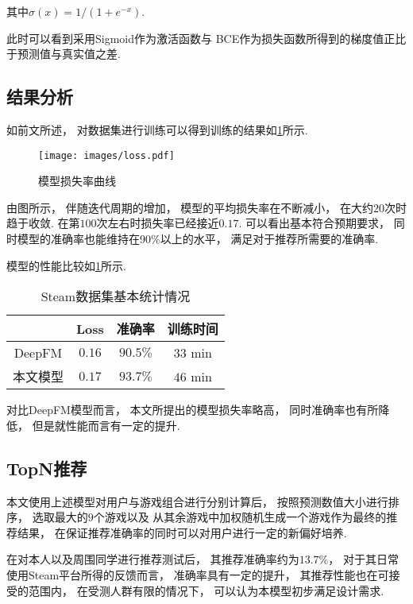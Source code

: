其中$ \sigma(x)=1/\left(1+e^{-x}\right) $.

此时可以看到采用Sigmoid作为激活函数与
BCE作为损失函数所得到的梯度值正比于预测值与真实值之差.

\subsection{结果分析}

如前文所述，
对数据集进行训练可以得到训练的结果如\cref{fig:loss}所示.

\begin{figure}[!htbp]
  \centering
  \texttt{[image: images/loss.pdf]}
  \caption{模型损失率曲线}\label{fig:loss}
\end{figure}

由图所示，
伴随迭代周期的增加，
模型的平均损失率在不断减小，
在大约$20$次时趋于收敛.
在第$100$次左右时损失率已经接近$0.17$.
可以看出基本符合预期要求，
同时模型的准确率也能维持在90\%以上的水平，
满足对于推荐所需要的准确率.

模型的性能比较如\cref{tb:comp}所示.

\begin{table}[!htbp]
  \begin{center}
    \caption{Steam数据集基本统计情况}\label{tb:comp}
    \begin{tabular}{cccc}
      \toprule
             & Loss   & 准确率 & 训练时间     \\
      \midrule
      DeepFM & $0.16$ & $90.5\%$  & $33$ min \\
      本文模型   & $0.17$ & $93.7\%$  & $46$ min    \\
      \bottomrule
    \end{tabular}
  \end{center}
\end{table}

对比DeepFM模型而言，
本文所提出的模型损失率略高，
同时准确率也有所降低，
但是就性能而言有一定的提升.

\subsection{TopN推荐}

本文使用上述模型对用户与游戏组合进行分别计算后，
按照预测数值大小进行排序，
选取最大的$9$个游戏以及
从其余游戏中加权随机生成一个游戏作为最终的推荐结果，
在保证推荐准确率的同时可以对用户进行一定的新偏好培养.

在对本人以及周围同学进行推荐测试后，
其推荐准确率约为$13.7$\%，
对于其日常使用Steam平台所得的反馈而言，
准确率具有一定的提升，
其推荐性能也在可接受的范围内，
在受测人群有限的情况下，
可以认为本模型初步满足设计需求.
